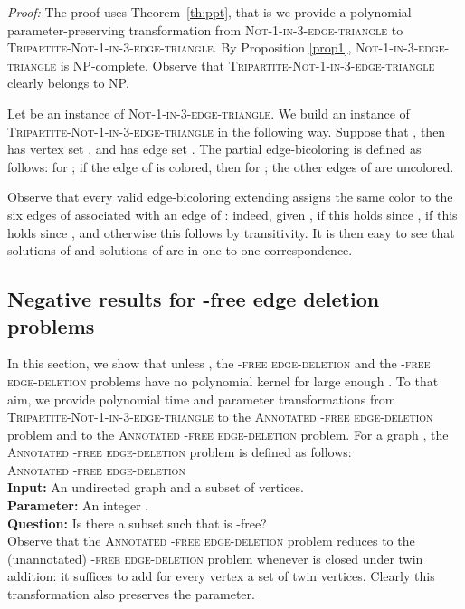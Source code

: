 \documentclass[11pt]{article}
\newenvironment{proof}{\noindent\textit{Proof: }}{{\hfill }}
\newcommand{\gbc}{\textsc{Not-1-in-3-edge-triangle}}
\newcommand{\tgbc}{\textsc{Tripartite-Not-1-in-3-edge-triangle}}
\begin{document}
\begin{proof}
The proof uses Theorem~\ref{th:ppt}, that is we provide a polynomial parameter-preserving transformation from \gbc{} to \tgbc{}. By Proposition \ref{prop1}, \gbc{} is NP-complete. Observe that \tgbc{} clearly belongs to NP.

Let  be an instance of \gbc{}. We build an instance  of \tgbc{} in the following way. Suppose that , then  has vertex set , and has edge set . The partial edge-bicoloring  is defined as follows:  for ; if the edge  of  is colored, then  for ; the other edges of  are uncolored.

Observe that every valid edge-bicoloring extending  assigns the same color to the six edges of  associated with an edge  of : indeed, given  , if  this holds since , if  this holds since , and otherwise this follows by transitivity. It is then easy to see that solutions of  and solutions of  are in one-to-one correspondence. 
\end{proof}

\subsection{Negative results for -free edge deletion problems}

In this section, we show that unless , the \textsc{-free edge-deletion} and the \textsc{-free edge-deletion} problems have no polynomial kernel for large enough . To that aim, we provide polynomial time and parameter transformations from \tgbc{} to the \textsc{Annotated -free edge-deletion} problem and to the \textsc{Annotated -free edge-deletion} problem. For a graph , the \textsc{Annotated -free edge-deletion} problem is defined as follows:\\

\noindent
\textsc{Annotated -free edge-deletion}\\
\textbf{Input:} An undirected graph  and a subset  of vertices.\\
\textbf{Parameter:} An integer .\\
\textbf{Question:} Is there a subset  such that  is -free?\\

Observe that the \textsc{Annotated -free edge-deletion} problem reduces to the (unannotated) \textsc{-free edge-deletion} problem whenever  is closed under twin addition: it suffices to add for every vertex  a set of  twin vertices. Clearly this transformation also preserves the parameter.  \\
\end{document}
